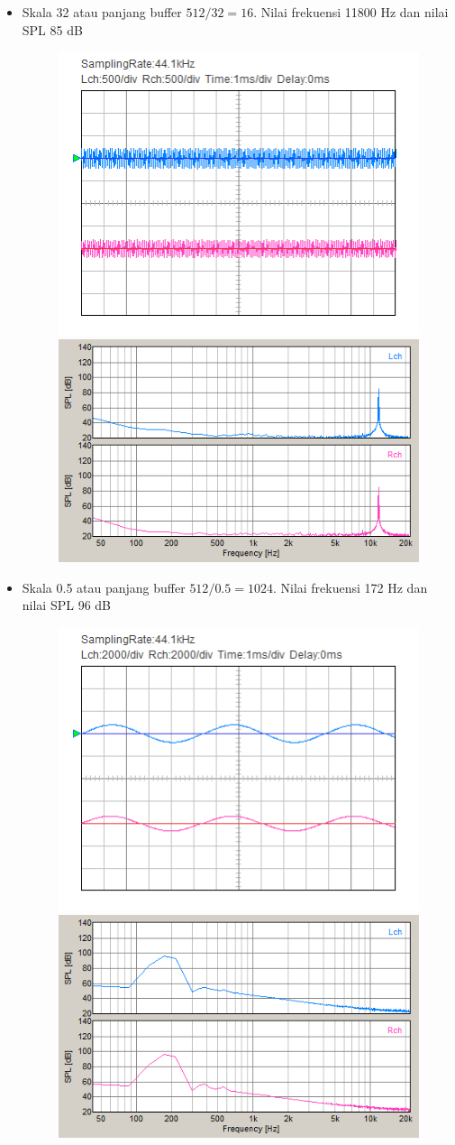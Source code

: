 \documentclass[12pt,]{article}
\begin{document}
\begin{itemize}
  		\item Skala 32 atau panjang buffer $512/32 = 16$.
  		Nilai frekuensi 11800 Hz dan nilai SPL 85 dB
  		\begin{figure}[H]
  			\centering
  			\includegraphics[width=0.45\linewidth]{result/day_4/newsinehighest}
  			\includegraphics[width=0.45\linewidth]{result/day_4/newsinehighestfft}
  		\end{figure}
  	
  		\item Skala 0.5 atau panjang buffer $512/0.5 = 1024$.
  		Nilai frekuensi 172 Hz dan nilai SPL 96 dB
  		\begin{figure}[H]
  			\centering
  			\includegraphics[width=0.45\linewidth]{result/day_4/osi_sine0p5}
  			\includegraphics[width=0.45\linewidth]{result/day_4/fft_sine0p5}
  		\end{figure}
  	

\end{itemize}
\end{document}
